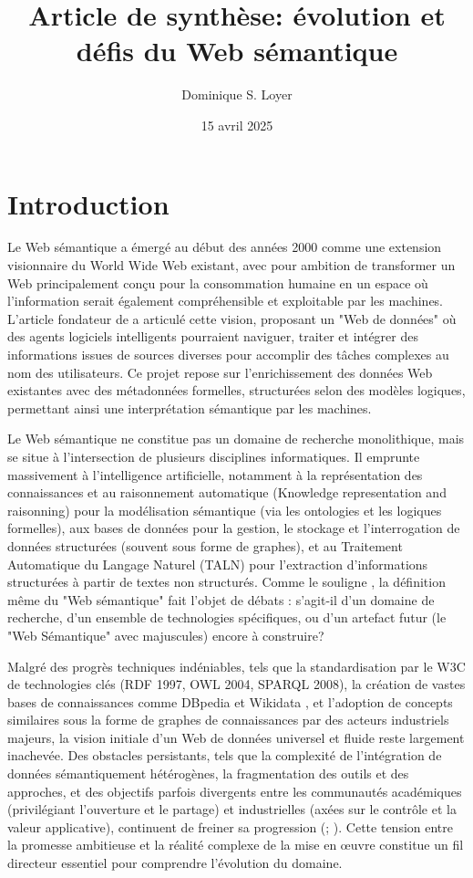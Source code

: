 \documentclass[9pt,twocolumn,twoside,french]{opticajnl}
\date{15 avril 2025}
\title{Article de synthèse: évolution et défis du Web sémantique}
\author{Dominique S. Loyer}
\affil[UQAM]{Résumé de la 2è lecture présenté au Professeur Petko Valtchev, dans le cadre d'un cours de doctorat, sciences du web, DIC-9335}
\affil[@]{loyer.dominique@courrier.uqam.ca}
\begin{document}
\maketitle

\section{Introduction}
Le Web sémantique a émergé au début des années 2000 comme une extension visionnaire du World Wide Web existant, avec pour ambition de transformer un Web principalement conçu pour la consommation humaine en un espace où l'information serait également compréhensible et exploitable par les machines. L'article fondateur de \citet{BernersLee2001} a articulé cette vision, proposant un "Web de données" où des agents logiciels intelligents pourraient naviguer, traiter et intégrer des informations issues de sources diverses pour accomplir des tâches complexes au nom des utilisateurs. Ce projet repose sur l'enrichissement des données Web existantes avec des métadonnées formelles, structurées selon des modèles logiques, permettant ainsi une interprétation sémantique par les machines.

Le Web sémantique ne constitue pas un domaine de recherche monolithique, mais se situe à l'intersection de plusieurs disciplines informatiques. Il emprunte massivement à l'intelligence artificielle, notamment à la représentation des connaissances et au raisonnement automatique (Knowledge representation and raisonning) pour la modélisation sémantique (via les ontologies et les logiques formelles), aux bases de données pour la gestion, le stockage et l'interrogation de données structurées (souvent sous forme de graphes), et au Traitement Automatique du Langage Naturel (TALN) pour l'extraction d'informations structurées à partir de textes non structurés. Comme le souligne \citet{Hitzler2021}, la définition même du "Web sémantique" fait l'objet de débats : s'agit-il d'un domaine de recherche, d'un ensemble de technologies spécifiques, ou d'un artefact futur (le "Web Sémantique" avec majuscules) encore à construire?

Malgré des progrès techniques indéniables, tels que la standardisation par le W3C de technologies clés (RDF 1997, OWL 2004, SPARQL 2008), la création de vastes bases de connaissances comme DBpedia et Wikidata \citet{Lehmann2015Dbpediaa}, et l'adoption de concepts similaires sous la forme de graphes de connaissances par des acteurs industriels majeurs, la vision initiale d'un Web de données universel et fluide reste largement inachevée. Des obstacles persistants, tels que la complexité de l'intégration de données sémantiquement hétérogènes, la fragmentation des outils et des approches, et des objectifs parfois divergents entre les communautés académiques (privilégiant l'ouverture et le partage) et industrielles (axées sur le contrôle et la valeur applicative), continuent de freiner sa progression (\citealp{Noy2019Industryscale}; \citealp{Hitzler2021}). Cette tension entre la promesse ambitieuse et la réalité complexe de la mise en œuvre constitue un fil directeur essentiel pour comprendre l'évolution du domaine.
\end{document}
